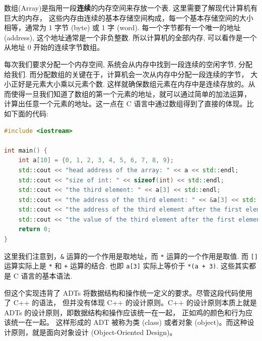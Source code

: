 \documentclass[a4paper]{ctexart}
\theoremstyle{definition}
\theoremstyle{definition}
\begin{document}



数组(Array)是指用一段{\bf 连续}的内存空间来存放一个表. 这里需要了解现代计算机有巨大的内存，
这些内存由连续的基本存储空间构成，每一个基本存储空间的大小相等，通常为 1 字节 (byte) 或 1 字 (word).
每一个字节都有一个唯一的地址 (address), 这个地址通常是一个非负整数. 所以计算机的全部内存, 可以看作是一个从地址 $0$ 开始的连续字节数组。

每次我们要求分配一个内存空间, 系统会从内存中找到一段连续的空闲字节, 分配给我们. 而分配数组的关键在于，计算机会一次从内存中分配一段连续的字节，
大小正好是元素大小乘以元素个数. 这样就确保数组元素在内存中是连续存放的。从而使得一旦我们知道了数组的第一个元素的地址，就可以通过简单的加法运算，
计算出任意一个元素的地址。这一点在 C 语言中通过数组得到了直接的体现。比如下面的代码:

\begin{lstlisting}[language=C++]
#include <iostream>

int main() {
    int a[10] = {0, 1, 2, 3, 4, 5, 6, 7, 8, 9};
    std::cout << "head address of the array: " << a << std::endl;
    std::cout << "size of int: " << sizeof(int) << std::endl;
    std::cout << "the third element: " << a[3] << std::endl;
    std::cout << "the address of the third element: " << &a[3] << std::endl;
    std::cout << "the address of the third element after the first element: " << (a + 3) << std::endl;
    std::cout << "the value of the third element after the first element: " << *(a + 3) << std::endl;
    return 0;
}  
\end{lstlisting}

这里我们注意到，\verb|&| 运算的一个作用是取地址，而 \verb|*| 运算的一个作用是取值. 
而 \verb|[]| 运算实际上是 \verb|*| 和 \verb|+| 运算的结合. 也即 \verb|a[3]| 实际上等价于 \verb|*(a + 3)|.
这些其实都是 C 语言的基本语法.

但这个实现违背了 ADTs 将数据结构和操作统一定义的要求。尽管这段代码使用了 C++ 的语法，
但并没有体现 C++ 的设计原则。C++ 的设计原则本质上就是 ADTs 的设计原则，即数据结构和操作应该统一在一起，
正如鸡的颜色和行为应该统一在一起。
这样形成的 ADT 被称为类 (class) 或者对象 (object)。而这种设计原则，就是面向对象设计 (Object-Oriented Design)。
\end{document}
